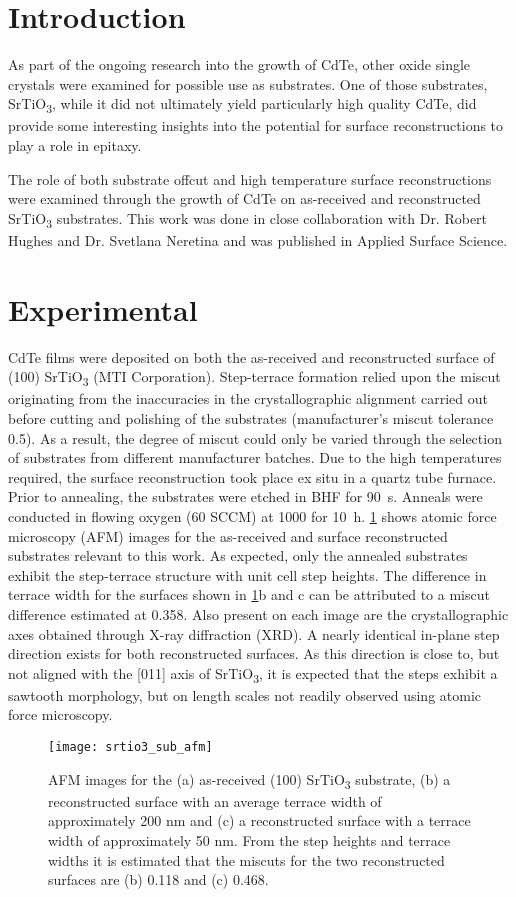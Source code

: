 \section{Introduction}
As part of the ongoing research into the growth of CdTe, other oxide single crystals were examined for possible use as substrates.
One of those substrates, SrTiO\textsubscript{3}, while it did not ultimately yield particularly high quality CdTe, did provide some interesting insights into the potential for surface reconstructions to play a role in epitaxy.

The role of both substrate offcut and high temperature surface reconstructions were examined through the growth of CdTe on as-received and reconstructed SrTiO\textsubscript{3} substrates.
This work was done in close collaboration with Dr.
Robert Hughes and Dr.
Svetlana Neretina and was published in Applied Surface Science\cite{Neretina2009a}.
\section{Experimental}
CdTe films were deposited on both the as-received and reconstructed surface of (100) SrTiO\textsubscript{3} (MTI Corporation).
Step-terrace formation relied upon the miscut originating from the inaccuracies in the crystallographic alignment carried out before cutting and polishing of the substrates (manufacturer's miscut tolerance 0.5\degree{}).
As a result, the degree of miscut could only be varied through the selection of substrates from different manufacturer batches.
Due to the high temperatures required, the surface reconstruction took place ex situ in a quartz tube furnace.
Prior to annealing, the substrates were etched in BHF for 90~s.
Anneals were conducted in flowing oxygen (60 SCCM) at 1000\celsius{} for 10~h.
\cref{fig:srtio3_sub_afm} shows atomic force microscopy (AFM) images for the as-received and surface reconstructed substrates relevant to this work.
As expected, only the annealed substrates exhibit the step-terrace structure with unit cell step heights.
The difference in terrace width for the surfaces shown in \cref{fig:srtio3_sub_afm}b and c can be attributed to a miscut difference estimated at 0.358\degree{}.
Also present on each image are the crystallographic axes obtained through X-ray diffraction (XRD).
A nearly identical in-plane step direction exists for both reconstructed surfaces.
As this direction is close to, but not aligned with the [011] axis of SrTiO\textsubscript{3}, it is expected that the steps exhibit a sawtooth morphology, but on length scales not readily observed using atomic force microscopy.
\begin{figure}
 \centering \texttt{[image: srtio3\_sub\_afm]}
 \caption[AFM of SrTiO\textsubscript{3} surfaces]{\label{fig:srtio3_sub_afm}AFM images for the (a) as-received (100) SrTiO\textsubscript{3} substrate, (b) a reconstructed surface with an average terrace width of approximately 200 nm and (c) a reconstructed surface with a terrace width of approximately 50 nm.
  From the step heights and terrace widths it is estimated that the miscuts for the two reconstructed surfaces are (b) 0.118\degree{} and (c) 0.468\degree{}.}
\end{figure}

